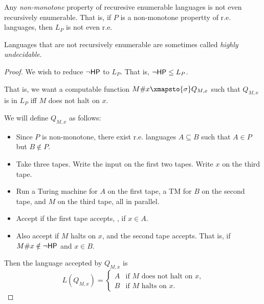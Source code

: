 \begin{theorem*}[Rice 1956] \label{thm:rice_1956}
    Any \emph{non-monotone} property of recuresive enumerable languages
    is not even recursively enumerable.
    That is, if $P$ is a non-monotone propertty of r.e. languages,
    then $L_P$ is not even r.e.
\end{theorem*}
\begin{remark}
    Languages that are not recursively enumerable are sometimes called
    \emph{highly undecidable}.
\end{remark}
\begin{proof}
    We wish to reduce $\neg\mathsf{HP}$ to $L_P$.
    That is, $\neg\mathsf{HP} \le L_P$.

    That is, we want a computable function $M\#x \xmapsto{\sigma} Q_{M, x}$
    such that $Q_{M, x}$ is in $L_P$ iff $M$ does not halt on $x$.

    We will define $Q_{M, x}$ as follows:
    \begin{itemize}
        \item Since $P$ is non-monotone, there exist r.e. languages
        $A \subseteq B$ such that $A \in P$ but $B \notin P$.
        \item Take three tapes.
        Write the input on the first two tapes.
        Write $x$ on the third tape.
        \item Run a Turing machine for $A$ on the first tape,
        a TM for $B$ on the second tape,
        and $M$ on the third tape,
        all in parallel.
        \item Accept if the first tape accepts, \ie, if $x \in A$.
        \item Also accept if $M$ halts on $x$, and the second tape accepts.
        That is, if $M\#x \notin \neg\mathsf{HP}$ and $x \in B$.
    \end{itemize}
    Then the language accepted by $Q_{M, x}$ is \[
        L(Q_{M, x}) = \begin{cases}
            A & \text{if $M$ does not halt on $x$,} \\
            B & \text{if $M$ halts on $x$.}
        \end{cases}
    \]
\end{proof}

